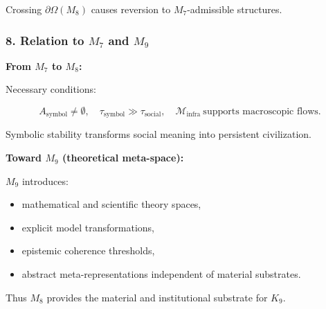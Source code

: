 Crossing $\partial\Omega(M_8)$ causes reversion to $M_7$-admissible structures.

\subsubsection*{8. Relation to \texorpdfstring{$M_7$}{M_7} and \texorpdfstring{$M_9$}{M_9}}

\textbf{From $M_7$ to $M_8$:}

Necessary conditions:

\[
A_{\mathrm{symbol}} \neq \emptyset,
\quad
\tau_{\mathrm{symbol}} \gg \tau_{\mathrm{social}},
\quad
\mathcal{M}_{\mathrm{infra}}\ \text{supports macroscopic flows}.
\]

Symbolic stability transforms social meaning into persistent civilization.

\textbf{Toward $M_9$ (theoretical meta-space):}

$M_9$ introduces:

\begin{itemize}
    \item mathematical and scientific theory spaces,
    \item explicit model transformations,
    \item epistemic coherence thresholds,
    \item abstract meta-representations independent of material substrates.
\end{itemize}

Thus $M_8$ provides the material and institutional substrate for $K_9$.
